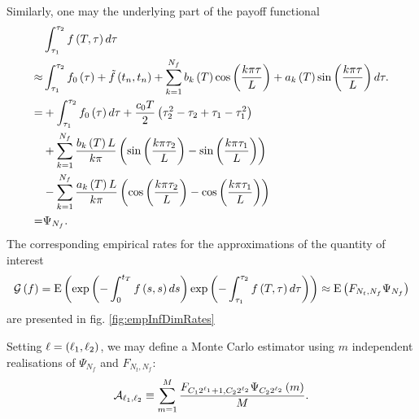 \documentclass[11pt]{amsart}
\begin{document}
Similarly, one may the underlying part of the 
payoff functional
\begin{align*}
&\int_{\tau_1}^{\tau_2}
f \left( {T,\tau} \right) d\tau 
\\
\approx & \int_{\tau_1}^{\tau_2}
f_0 \left( {\tau} \right) + \tilde f \left( {t_n, t_n} \right) +
\displaystyle\sum\limits_{k=1}^{N_f}
b_k \left( {T} \right) \cos \left( {\frac{k \pi \tau}{L}} \right) + a_k \left( {T} \right) \sin \left( {\frac{k \pi \tau}{L}} \right)
d \tau.
\\
= &+ \int_{\tau_1}^{\tau_2}
f_0 \left( {\tau} \right) d \tau + \frac{c_0 T}{2} \left( {\tau_2^2 - \tau_2 +\tau_1 - \tau_1^2} \right) 
\\
&+
\displaystyle\sum\limits_{k=1}^{N_f} 
\frac{b_k \left( {T} \right) L}{k \pi} 
\left( {\sin \left( {\frac{k \pi \tau_2}{L}} \right)  - \sin \left( {\frac{k \pi \tau_1}{L}} \right) } \right)
\\
&-
\displaystyle\sum\limits_{k=1}^{N_f} 
\frac{a_k \left( {T} \right) L}{k \pi} 
\left( {\cos \left( {\frac{k \pi \tau_2}{L}} \right)  - \cos \left( {\frac{k \pi \tau_1}{L}} \right) } \right)
\\
=& \Psi_{N_f} .
\end{align*}
The corresponding empirical rates for the approximations of the quantity of interest
\begin{align*}
\mathcal G \left( {f} \right) =
\mathrm{E} \left( {{\mathrm{exp}\left ( {-\int_0^{t_{T}} f \left( {s,s} \right) ds}\right )\mathrm{exp}\left ( {-\int_{\tau_1}^{\tau_2} f \left( {T,\tau} \right) d\tau}\right )}} \right)
\approx
\mathrm{E} \left( {{
F_{N_t,N_f}
\Psi_{N_f} }} \right)
\end{align*}
are presented in fig. \ref{fig:empInfDimRates}


Setting $\ell = \left( {\ell_1 , \ell_2} \right)$, we may define a Monte
Carlo estimator using $m$ independent realisations of $\Psi_{N_f}$ and $F_{N_t,N_f}$:
\begin{align}
\mathcal A_{\ell_1, \ell_2} 
\equiv
\displaystyle\sum\limits_{m=1}^{M}
\frac{F_{C_1 2^{\ell_1}+1,C_2 2^{\ell_2}} \Psi_{C_2 2^{\ell_2} }\left( {m} \right)}{M}.
\end{align}
\end{document}
